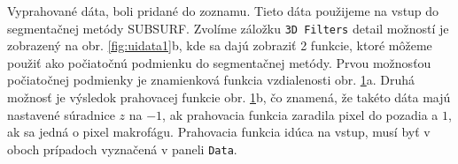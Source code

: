 \documentclass[a4paper,11pt,oneside]{article}%
\begin{document}
Vyprahované dáta, boli pridané do zoznamu. Tieto dáta použijeme na vstup do segmentačnej metódy SUBSURF. Zvolíme záložku \texttt{3D Filters} detail možností je zobrazený na obr. \ref{fig:uidata1}b, kde sa dajú zobraziť 2 funkcie, ktoré môžeme použiť ako počiatočnú podmienku do segmentačnej metódy. Prvou možnosťou počiatočnej podmienky  je znamienková funkcia vzdialenosti obr. \ref{fig:pp}a. Druhá možnosť je výsledok prahovacej funkcie  obr. \ref{fig:pp}b, čo znamená, že takéto dáta majú nastavené súradnice $z$ na $-1$, ak prahovacia funkcia zaradila pixel do pozadia a $1$, ak sa jedná o pixel makrofágu. Prahovacia funkcia idúca na vstup, musí byť v oboch prípadoch vyznačená v paneli \texttt{Data}.


\begin{figure}[H]%
    \centering
    \qquad
    \caption{}%
    \label{fig:pp}%
\end{figure}
\end{document}
